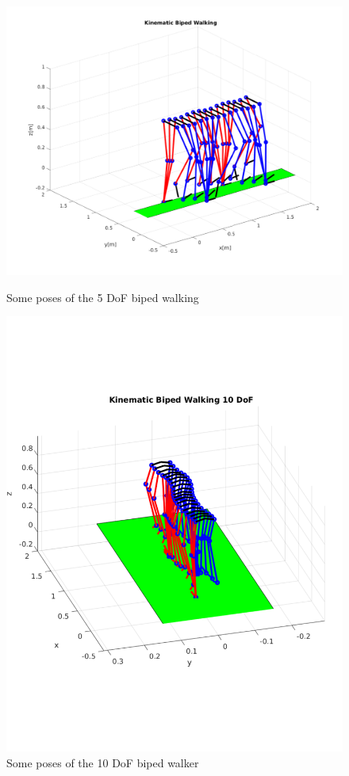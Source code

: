 \documentclass[a4paper]{article}
\begin{document}
\begin{figure}
\centering
 \begin{minipage}{0.48\textwidth}

    \includegraphics[scale=0.42]{plot/kinematic/biped_walking.pdf} 
    \caption{Some poses of the 5 DoF biped walking} 
    \label{fig:biped_walking3dof}
  \end{minipage}
 
   \begin{minipage}{0.48\textwidth}
     \includegraphics[scale=0.5]{plot/kinematic/biped_walking10dof.pdf} 
        \caption{Some poses of the 10 DoF biped walker} 
        \label{fig:biped_walking12dof}
   \end{minipage}
\end{figure}
\restoregeometry
\end{document}
